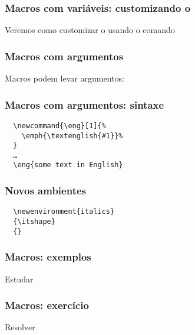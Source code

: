 \begin{frame}
  \frametitle{Macros com variáveis: customizando o
  \latexcode{\maketitle}}
  \LARGE
  Veremos como customizar o \latexcode{\maketitle} usando o comando
  \latexcode{\renewcommand{\maketitle}{…}}
\end{frame}

\begin{frame}
  \frametitle{Macros com argumentos}
  \LARGE
  Macros podem levar argumentos: 
\end{frame}

\begin{frame}[fragile]
  \frametitle{Macros com argumentos: sintaxe}
  \begin{verbatim}
  \newcommand{\eng}[1]{%
    \emph{\textenglish{#1}}%
  }
  …
  \eng{some text in English}
  \end{verbatim}
\end{frame}

\begin{frame}[fragile]
  \frametitle{Novos ambientes}
  \begin{verbatim}
  \newenvironment{italics}
  {\itshape}
  {}
  \end{verbatim}
\end{frame}

\begin{frame}
  \frametitle{Macros: exemplos}
  \huge
  Estudar 
\end{frame}

\begin{frame}
  \frametitle{Macros: exercício}
  \huge
  Resolver 
\end{frame}

